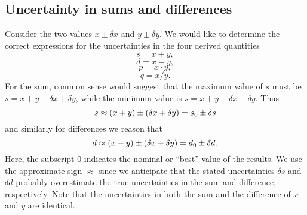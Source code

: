 \subsection{Uncertainty in sums and differences}

Consider the two values $x \pm \delta x$ and $y \pm \delta y$.  We would like to determine the correct
expressions for the uncertainties in the four derived quantities
\begin{equation}
	s = x + y,
\end{equation}
\begin{equation}
d = x - y,
\end{equation}
\begin{equation}
p = x  \cdot y,
\end{equation}
\begin{equation}
q = x / y.
\end{equation}
For the sum, common sense would suggest that the maximum value of $s$ must be $s = x + y + \delta x + \delta y$, while the minimum value is 
$s = x + y - \delta x- \delta y$.  Thus
\begin{equation}
\index{Uncertainty!sums}
s \approx (x + y) \pm (\delta x + \delta y ) = s_0 \pm \delta s
\end{equation}
and similarly for differences we reason that
\begin{equation}
\index{Uncertainty!differences}
d \approx (x - y) \pm (\delta x + \delta y) = d_0 \pm \delta d.
\end{equation}
Here, the subscript $0$ indicates the nominal or ``best'' value of the results.
We use the approximate sign $\approx$ since we anticipate that the stated uncertainties $\delta s$ and $\delta d$ 
probably overestimate the true uncertainties in the sum and difference, respectively.
Note that the uncertainties in both the sum and the difference of $x$ and $y$ are identical.
